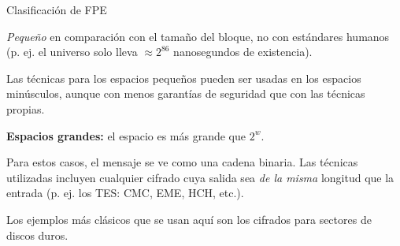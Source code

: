 \begin{frame}{Clasificación de FPE}
  {
    \textit{Pequeño} en comparación con el tamaño del bloque, no con
    estándares humanos (p. ej. el universo solo lleva $ \approx 2^{86}$
    nanosegundos de existencia).

    Las técnicas para los espacios pequeños pueden ser usadas en los
    espacios minúsculos, aunque con menos garantías de seguridad que con
    las técnicas propias.
  }

  {
    \textbf{Espacios grandes:} el espacio es más grande que $ 2^w $.

    Para estos casos, el mensaje se ve como una cadena binaria. Las técnicas
    utilizadas incluyen cualquier cifrado cuya salida sea \textit{de la misma}
    longitud que la entrada (p. ej. los TES: CMC, EME, HCH, etc.).
  }

  {
    Los ejemplos más clásicos que se usan aquí son los cifrados para sectores
    de discos duros.
  }

\end{frame}
